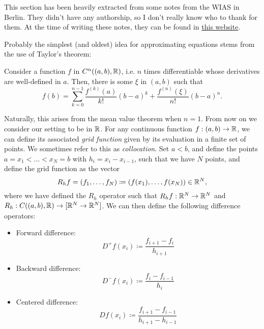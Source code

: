 This section has been heavily extracted from some notes from the WIAS in Berlin. They didn't have any authorship, so I don't really know who to thank for them. At the time of writing these notes, they can be found in \href{https://www.wias-berlin.de/people/john/LEHRE/NUMERIK\_IV\_21\_22/num\_konv\_dom\_prob\_3.pdf}{this website}.

Probably the simplest (and oldest) idea for approximating equations stems from the use of Taylor's theorem:

\begin{theorem}\label{thm:taylor}
    Consider a function $f$ in $C^n((a,b), \mathbb{R})$, i.e. $n$ times differentiable whose derivatives are well-defined in $a$. Then, there is some $\xi$ in $(a,b)$ such that
    \begin{equation}
    f(b) = \sum_{k=0}^{n-1}\frac{f^{(k)}(a)}{k!}(b-a)^k + \frac{f^{(n)}(\xi)}{n!}(b-a)^n.
    \end{equation}
\end{theorem}
Naturally, this arises from the mean value theorem when $n=1$. From now on we consider our setting to be in $\mathbb{R}$. For any continuous function $f:(a,b)\to \mathbb{R}$, we can define its associated \emph{grid function} given by its evaluation in a finite set of points. We sometimes refer to this as \emph{collocation}. Set $a<b$, and define the points $a=x_1<\hdots<x_N=b$ with $h_i=x_{i}-x_{i-1}$, such that we have $N$ points, and define the grid function as the vector
    \begin{equation}\label{eq:def-grid-function}
    R_hf = (f_1, \hdots, f_N) \coloneqq (f(x_1), \hdots, f(x_N)) \in \mathbb{R}^N,
    \end{equation}
    where we have defined the $R_h$ operator such that $R_hf:\mathbb{R}^N \to \mathbb{R}^N$ and $R_h:C((a,b),\mathbb{R})\to [\mathbb{R}^N\to\mathbb{R}^N]$.  We can then define the following difference operators: 
    \begin{itemize}
        \item Forward difference: 
            \begin{equation*}
            D^+f(x_i) \coloneqq \frac{f_{i+1} - f_i}{h_{i+1}}
            \end{equation*}
        \item Backward difference: 
            \begin{equation*}
            D^-f(x_i) \coloneqq \frac{f_{i} - f_{i-1}}{h_{i}}
            \end{equation*}
        \item Centered difference:
            \begin{equation*}
            Df(x_i) \coloneqq \frac{f_{i+1} - f_{i-1}}{h_{i+1} - h_{i-1}}
            \end{equation*}
    \end{itemize}
